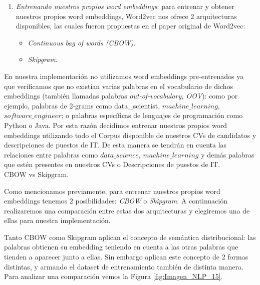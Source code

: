 \documentclass[12pt,a4paper]{article}
\makeatletter
\renewcommand\paragraph{\@startsection{paragraph}{4}{\z@}
            {-2.5ex\@plus -1ex \@minus -.25ex}
            {1.25ex \@plus .25ex}
            {\normalfont\normalsize\bfseries}}
\makeatother
\begin{document}
\begin{sloppypar}
\begin{enumerate}
\cleardoublepage

\item \textit{Entrenando nuestros propios word embeddings}: para entrenar y obtener nuestros propios word embeddings, Word2vec nos ofrece 2 arquitecturas disponibles, las cuales fueron propuestas en el paper original de Word2vec\cite{NLP_11}:
\begin{itemize}
\item \textit{Continuous bag of words (CBOW)}.
\item \textit{Skipgram}.
\end{itemize}

\end{enumerate}

En nuestra implementación no utilizamos word embeddings pre-entrenados ya que verificamos que no existían varias palabras en el vocabulario de dichos embeddings (también llamadas palabras \textit{out-of-vocabulary, OOV}): como por ejemplo, palabras de 2-grams como data\_scientist, $machine\_learning$, $software\_engineer$; o palabras específicas de lenguajes de programación como Python o Java. Por esta razón decidimos entrenar nuestros propios word embeddings utilizando todo el Corpus disponible de nuestros CVs de candidatos y descripciones de puestos de IT. De esta manera se tendrán en cuenta las relaciones entre palabras como $data\_science$, $machine\_learning$ y demás palabras que estén presentes en nuestros CVs o Descripciones de puestos de IT.
\\

\paragraph{CBOW vs Skipgram.}\label{cbow_vs_skip}

Como mencionamos previamente, para entrenar nuestros propios word embeddings tenemos 2 posibilidades: \textit{CBOW} o \textit{Skipgram}. A continuación realizaremos una comparación entre estas dos arquitecturas y elegiremos una de ellas para nuestra implementación.

Tanto CBOW como Skipgram aplican el concepto de semántica distribucional: las palabras obtienen su embedding teniendo en cuenta a las otras palabras que tienden a aparecer junto a ellas. Sin embargo aplican este concepto de 2 formas distintas, y armando el dataset de entrenamiento también de distinta manera. Para analizar una comparación vemos la Figura \ref{fig:Imagen_NLP_15}.


\end{sloppypar}
\end{document}

